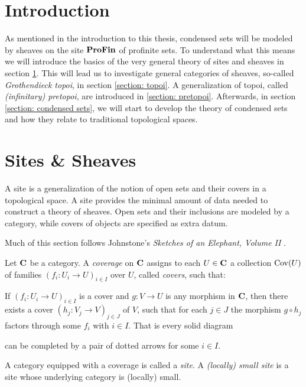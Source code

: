 
\section*{Introduction}
As mentioned in the introduction to this thesis, condensed sets will be modeled by sheaves on the site ${\mathbf{ProFin}}$ of profinite sets. To understand what this means we will introduce the basics of the very general theory of sites and sheaves in section \ref{section: sites and sheaves}. This will lead us to investigate general categories of sheaves, so-called \emph{Grothendieck topoi}, in section \ref{section: topoi}. A generalization of topoi, called \emph{(infinitary) pretopoi}, are introduced in \ref{section: pretopoi}. Afterwards, in section \ref{section: condensed sets}, we will start to develop the theory of condensed sets and how they relate to traditional topological spaces.

\section{Sites \& Sheaves}
\label{section: sites and sheaves}

A site is a generalization of the notion of open sets and their covers in a topological space. A site provides the minimal amount of data needed to construct a theory of sheaves. Open sets and their inclusions are modeled by a category, while covers of objects are specified as extra datum.

Much of this section follows Johnstone's \emph{Sketches of an Elephant, Volume II} \cite[C2]{elephant2}.


\begin{definition}
	\label{definition: coverages and sites}
	
	Let ${{\mathbf{C}}}$ be a category. A \emph{coverage} on ${{\mathbf{C}}}$ assigns to each $U \in {{\mathbf{C}}}$ a collection ${\operatorname{Cov}(U)}$ of families $(f_i\colon U_i \to U)_{i\in I}$ over $U$, called \emph{covers}, such that:
	
	If $(f_i\colon U_i \to U)_{i\in I}$ is a cover and $g\colon V\to U$ is any morphism in ${{\mathbf{C}}}$, then there exists a cover $(h_j\colon V_j \to V)_{j\in J}$ of $V$, such that for each $j\in J$ the morphism $g\circ h_j$ factors through some $f_i$ with $i \in I$. That is every solid diagram 
	\begin{center}
	\end{center}
	can be completed by a pair of dotted arrows for some $i\in I$.
	
	A category equipped with a coverage is called a \emph{site}. A \emph{(locally) small site} is a site whose underlying category is (locally) small.
\end{definition}

